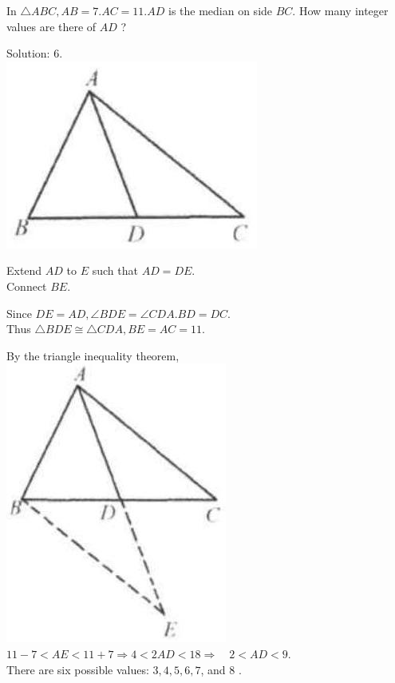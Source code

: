 \documentclass{article}
\begin{document}
In \(\triangle A B C, A B=7 . A C=11 . A D\) is the median on side \(B C\). How many integer values are there of \(A D\) ?

Solution: 6.\\
\centering
\includegraphics[width=\textwidth]{images/024(3).jpg}


Extend \(A D\) to \(E\) such that \(A D=D E\).\\
Connect \(B E\).

Since \(D E=A D, \angle B D E=\angle C D A . B D=D C\).\\
Thus \(\triangle B D E \cong \triangle C D A, B E=A C=11\).

By the triangle inequality theorem,\\
\centering
\includegraphics[width=\textwidth]{images/025(1).jpg}\\
\(11-7<A E<11+7 \Rightarrow 4<2 A D<18 \Rightarrow \quad 2<A D<9\).\\
There are six possible values: \(3,4,5,6,7\), and 8 .
\end{document}
